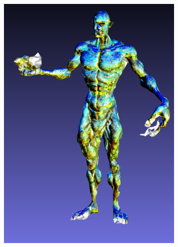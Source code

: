 \begin{figure}[ht]
\begin{subfigure}[b]{0.108\textwidth}
        \caption{}
    \end{subfigure}
    \begin{subfigure}[b]{0.2\textwidth}
        \centering
        \includegraphics[width=\textwidth]{etc/bias/bias_rich_fantasia3d.png}
        \caption{}
    \end{subfigure}
    \begin{subfigure}[b]{0.12\textwidth}
        \centering

\end{subfigure}
\end{figure}
